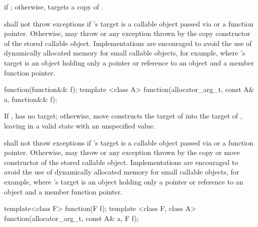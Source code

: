\begin{itemdescr}
\pnum
\postconditions {} if ; otherwise,
 targets a copy of .

\pnum
\throws shall not throw exceptions if 's target is
a callable object passed via  or
a function pointer. Otherwise, may throw 
or any exception thrown by the copy constructor of the stored callable object.
\enternote Implementations are encouraged to avoid the use of
dynamically allocated memory for small callable objects, for example, where
's target is an object holding only a pointer or reference
to an object and a member function pointer. \exitnote
\end{itemdescr}

\begin{itemdecl}
function(function&& f);
template <class A> function(allocator_arg_t, const A& a, function&& f);
\end{itemdecl}

\begin{itemdescr}
\pnum
\effects If ,  has
no target; otherwise, move constructs the target of 
into the target of , leaving  in
a valid state with an unspecified value.

\pnum
\throws shall not throw exceptions if 's target is
a callable object passed via  or
a function pointer. Otherwise, may throw  or
any exception thrown by the copy or move constructor
of the stored callable object.
\enternote Implementations are encouraged to avoid the use of
dynamically allocated memory for small callable objects, for example,
where 's target is an object holding only a pointer or reference
to an object and a member function pointer. \exitnote
\end{itemdescr}

\begin{itemdecl}
template<class F> function(F f);
template <class F, class A> function(allocator_arg_t, const A& a, F f);
\end{itemdecl}

